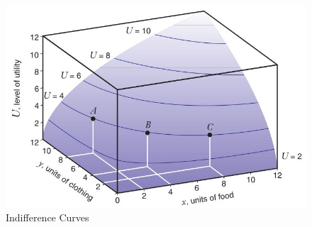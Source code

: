 \documentclass[11pt,t]{beamer}
\begin{document}
\begin{frame}
  \begin{figure}
    \caption{Indifference Curves}
    
    \includegraphics[width= 0.7\linewidth]{figures/fig3_4.jpg}
  \end{figure}
\end{frame}
\end{document}
